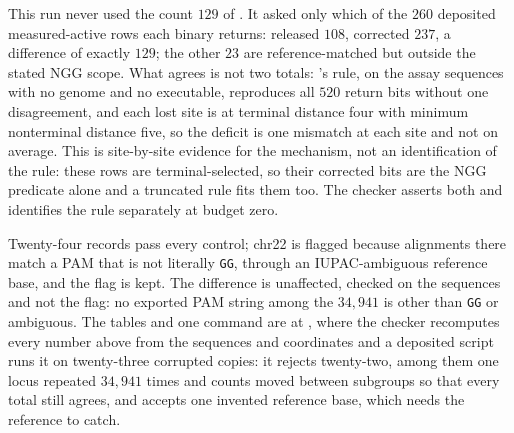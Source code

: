 This run never used the count $129$ of . It asked only which of
the $260$ deposited measured-active rows each binary returns: released $108$, corrected
$237$, a difference of exactly $129$; the other $23$ are reference-matched but outside the
stated NGG scope. What agrees is not two totals: 's rule, on the assay
sequences with no genome and no executable, reproduces all $520$ return bits without one
disagreement, and each lost site is at terminal distance four with minimum nonterminal distance
five, so the deficit is one mismatch at each site and not on average. This is site-by-site
evidence for the mechanism, not an identification of the rule: these rows are terminal-selected,
so their corrected bits are the NGG predicate alone and a truncated rule fits them too. The
checker asserts both and identifies the rule separately at budget zero.

Twenty-four records pass every control; chr22 is flagged because alignments there match a PAM
that is not literally \texttt{GG}, through an IUPAC-ambiguous reference base, and the flag is
kept. The difference is unaffected, checked on the sequences and not the flag: no exported PAM
string among the $34{,}941$ is other than \texttt{GG} or ambiguous. The tables and one command
are at , where the checker recomputes every number above
from the sequences and coordinates and a deposited script runs it on twenty-three corrupted
copies: it rejects twenty-two, among them one locus repeated $34{,}941$ times and counts moved
between subgroups so that every total still agrees, and accepts one invented reference base,
which needs the reference to catch.


